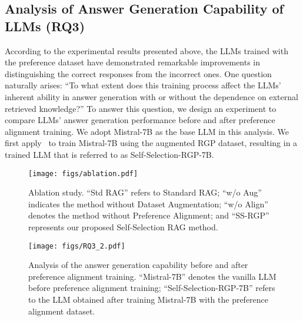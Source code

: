 \subsection{Analysis of Answer Generation Capability of LLMs (RQ3)}
\label{sec:llm-improve}


According to the experimental results presented above, the LLMs trained with the preference dataset have demonstrated remarkable improvements in distinguishing the correct responses from the incorrect ones.
One question naturally arises: ``To what extent does this training process affect the LLMs’ inherent ability in answer generation with or without the dependence on external retrieved knowledge?''
To answer this question, we design an experiment to compare LLMs' answer generation performance before and after preference alignment training. 
We adopt Mistral-7B as the base LLM in this analysis.
We first apply \approach~to train Mistral-7B using the augmented RGP dataset, resulting in a trained LLM that is referred to as Self-Selection-RGP-7B.

\begin{figure}[t]
\setlength\abovecaptionskip{-0.4px}
\setlength\belowcaptionskip{-4px}
  \centering
  \texttt{[image: figs/ablation.pdf]}
  \caption{Ablation study. ``Std RAG'' refers to Standard RAG; ``w/o Aug'' indicates the method without Dataset Augmentation; ``w/o Align'' denotes the method without Preference Alignment; and ``SS-RGP'' represents our proposed Self-Selection RAG method.} 
  \label{fig:ablation}
  \vspace{-0.4cm}
\end{figure}



\begin{figure*}[t]
\setlength\abovecaptionskip{-0.3px}
\setlength\belowcaptionskip{-0.4px}
  \centering
  \texttt{[image: figs/RQ3\_2.pdf]}
  \caption{Analysis of the answer generation capability before and after preference alignment training. ``Mistral-7B'' denotes the vanilla LLM before preference alignment training; ``Self-Selection-RGP-7B'' refers to the LLM obtained after training Mistral-7B with the preference alignment dataset.} %
  \label{fig:llm-ans}
\end{figure*}


